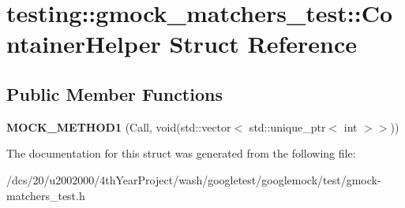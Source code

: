 \hypertarget{structtesting_1_1gmock__matchers__test_1_1ContainerHelper}{}\section{testing\+:\+:gmock\+\_\+matchers\+\_\+test\+:\+:Container\+Helper Struct Reference}
\label{structtesting_1_1gmock__matchers__test_1_1ContainerHelper}
\subsection*{Public Member Functions}
\begin{DoxyCompactItemize}
\item 
\mbox{\label{structtesting_1_1gmock__matchers__test_1_1ContainerHelper_a9cacbc284923ffbd3bef4c83cc500e68}} 
{\bfseries M\+O\+C\+K\+\_\+\+M\+E\+T\+H\+O\+D1} (Call, void(std\+::vector$<$ std\+::unique\+\_\+ptr$<$ int $>$$>$))
\end{DoxyCompactItemize}


The documentation for this struct was generated from the following file\+:\begin{DoxyCompactItemize}
\item 
/dcs/20/u2002000/4th\+Year\+Project/wash/googletest/googlemock/test/gmock-\/matchers\+\_\+test.\+h\end{DoxyCompactItemize}
